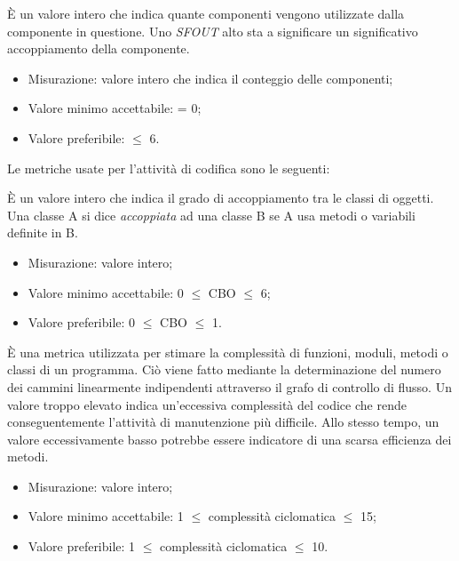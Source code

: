 			È un valore intero che indica quante componenti vengono utilizzate dalla componente in questione. Uno \textit{SFOUT} alto sta a significare un significativo accoppiamento della componente.
		\begin{itemize}
			\item{Misurazione: valore intero che indica il conteggio delle componenti;}
			\item{Valore minimo accettabile: = 0;}
			\item{Valore preferibile: $\leq$ 6.}
		\end{itemize}
		
		Le metriche usate per l'attività di codifica sono le seguenti:
		
			È un valore intero che indica il grado di accoppiamento tra le classi di oggetti. Una classe A si dice \textit{accoppiata} ad una classe B se A usa metodi o variabili definite in B.
		\begin{itemize}
			\item{Misurazione: valore intero;}
			\item{Valore minimo accettabile: 0 $\leq$ CBO $\leq$ 6;}
			\item{Valore preferibile: 0 $\leq$ CBO $\leq$ 1.}
		\end{itemize}
			
			È una metrica utilizzata per stimare la complessità di funzioni, moduli, metodi o classi di un programma. Ciò viene fatto mediante la determinazione del numero dei cammini linearmente indipendenti attraverso il grafo di controllo di flusso. Un valore troppo elevato indica un'eccessiva complessità del codice che rende conseguentemente l'attività di manutenzione più difficile. Allo stesso tempo, un valore eccessivamente basso potrebbe essere indicatore di una scarsa efficienza dei metodi.
		\begin{itemize}
			\item{Misurazione: valore intero;}
			\item{Valore minimo accettabile: 1 $\leq$ complessità ciclomatica $\leq$ 15;}
			\item{Valore preferibile: 1 $\leq$ complessità ciclomatica $\leq$ 10.}
		\end{itemize}
			

